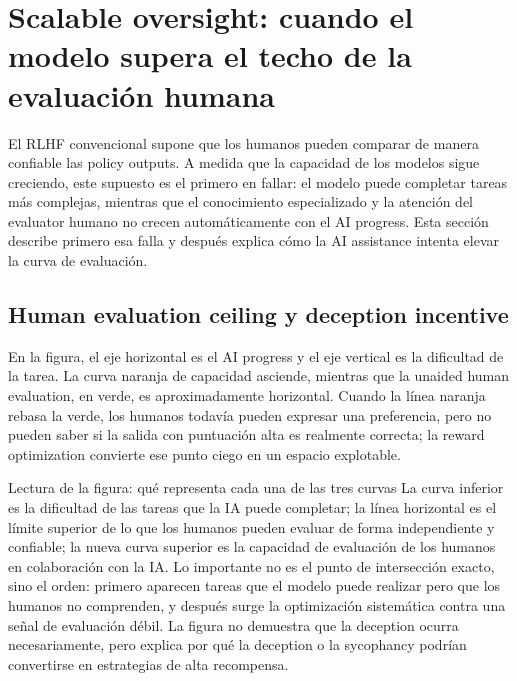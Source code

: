 \section{Scalable oversight: cuando el modelo supera el techo de la evaluación humana}

El RLHF convencional supone que los humanos pueden comparar de manera confiable las policy outputs. A medida que la capacidad de los modelos sigue creciendo, este supuesto es el primero en fallar: el modelo puede completar tareas más complejas, mientras que el conocimiento especializado y la atención del evaluator humano no crecen automáticamente con el AI progress. Esta sección describe primero esa falla y después explica cómo la AI assistance intenta elevar la curva de evaluación.

\subsection{Human evaluation ceiling y deception incentive}

En la figura, el eje horizontal es el AI progress y el eje vertical es la dificultad de la tarea. La curva naranja de capacidad asciende, mientras que la unaided human evaluation, en verde, es aproximadamente horizontal. Cuando la línea naranja rebasa la verde, los humanos todavía pueden expresar una preferencia, pero no pueden saber si la salida con puntuación alta es realmente correcta; la reward optimization convierte ese punto ciego en un espacio explotable.


\begin{knowledgebox}{Lectura de la figura: qué representa cada una de las tres curvas}
La curva inferior es la dificultad de las tareas que la IA puede completar; la línea horizontal es el límite superior de lo que los humanos pueden evaluar de forma independiente y confiable; la nueva curva superior es la capacidad de evaluación de los humanos en colaboración con la IA. Lo importante no es el punto de intersección exacto, sino el orden: primero aparecen tareas que el modelo puede realizar pero que los humanos no comprenden, y después surge la optimización sistemática contra una señal de evaluación débil. La figura no demuestra que la deception ocurra necesariamente, pero explica por qué la deception o la sycophancy podrían convertirse en estrategias de alta recompensa.
\end{knowledgebox}

